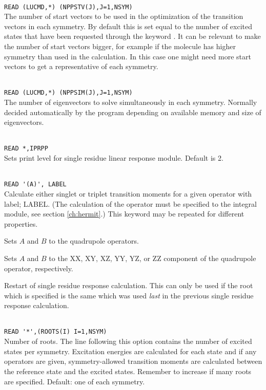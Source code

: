 \begin{description}
\item{}\\
\verb|READ (LUCMD,*) (NPPSTV(J),J=1,NSYM)|\\
 The number of start vectors to be used in the
  optimization of the transition vectors in each symmetry. By default
  this is set equal to the number of excited states that have been
  requested through the keyword .
  It can be relevant to make the number of start vectors bigger,
  for example if the molecule has higher symmetry than used in the
  calculation. In this case one might need more start vectors to
  get a representative of each symmetry.


\item{}\\
\verb|READ (LUCMD,*) (NPPSIM(J),J=1,NSYM)|\\
The number of eigenvectors to solve simultaneously in each
symmetry. Normally decided automatically by the program depending on
available memory and size of eigenvectors.

\item{}\\
\verb|READ *,IPRPP|\\
Sets print level for single residue linear response module. Default is 2.

\item{}\\
\verb|READ '(A)', LABEL|\\
Calculate either singlet or triplet transition moments for a given operator with label; LABEL.
(The calculation of the operator must be specified to the integral
module, see section \ref{ch:hermit}.)
This keyword may be repeated for different properties.

\item{}
Sets $A$ and $B$ to the quadrupole operators.

\item{}
Sets $A$ and $B$ to the XX, XY, XZ, YY, YZ, or ZZ component of the
quadrupole operator, respectively.

\item{}
Restart of single residue response
calculation. This can only be used if the root which is 
specified is the same which was used \textit{last} in the previous
single residue response calculation.

\item{}\\
\verb|READ '*',(ROOTS(I) I=1,NSYM)|\\
Number of roots.  The line following this option contains the number
of excited states per symmetry. Excitation
energies are calculated for each state and if
any operators are given, 
symmetry-allowed transition moments are
calculated between the 
reference state and the excited states.
Remember to increase  if many roots are specified.
Default: one of each symmetry.


\end{description}
